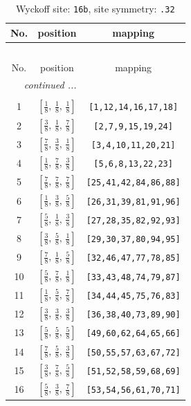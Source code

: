 \documentclass[fleqn,8pt]{jsarticle}
\begin{document}
\renewcommand{\arraystretch}{1.2}
\begin{longtable}{ccc}
\caption{Wyckoff site: {\tt 16b}, site symmetry: {\tt .32}}
 \\
 \hline \hline
No. & position & mapping \\ \hline \endfirsthead

\multicolumn{2}{l}{\tablename\ \thetable{}} \\
 \hline \hline
No. & position & mapping \\ \hline \endhead

 \hline \hline
\multicolumn{2}{r}{\footnotesize\it continued ...} \\ \endfoot

 \hline \hline
\multicolumn{2}{r}{} \\ \endlastfoot

1 & $\left[ \frac{1}{8},\, \frac{1}{8},\, \frac{1}{8} \right]$ & {\tt [1,12,14,16,17,18]} \\ \hline
2 & $\left[ \frac{3}{8},\, \frac{1}{8},\, \frac{7}{8} \right]$ & {\tt [2,7,9,15,19,24]} \\ \hline
3 & $\left[ \frac{7}{8},\, \frac{3}{8},\, \frac{1}{8} \right]$ & {\tt [3,4,10,11,20,21]} \\ \hline
4 & $\left[ \frac{1}{8},\, \frac{7}{8},\, \frac{3}{8} \right]$ & {\tt [5,6,8,13,22,23]} \\ \hline
5 & $\left[ \frac{7}{8},\, \frac{7}{8},\, \frac{7}{8} \right]$ & {\tt [25,41,42,84,86,88]} \\ \hline
6 & $\left[ \frac{1}{8},\, \frac{3}{8},\, \frac{5}{8} \right]$ & {\tt [26,31,39,81,91,96]} \\ \hline
7 & $\left[ \frac{5}{8},\, \frac{1}{8},\, \frac{3}{8} \right]$ & {\tt [27,28,35,82,92,93]} \\ \hline
8 & $\left[ \frac{3}{8},\, \frac{5}{8},\, \frac{1}{8} \right]$ & {\tt [29,30,37,80,94,95]} \\ \hline
9 & $\left[ \frac{7}{8},\, \frac{1}{8},\, \frac{5}{8} \right]$ & {\tt [32,46,47,77,78,85]} \\ \hline
10 & $\left[ \frac{5}{8},\, \frac{7}{8},\, \frac{1}{8} \right]$ & {\tt [33,43,48,74,79,87]} \\ \hline
11 & $\left[ \frac{1}{8},\, \frac{5}{8},\, \frac{7}{8} \right]$ & {\tt [34,44,45,75,76,83]} \\ \hline
12 & $\left[ \frac{3}{8},\, \frac{3}{8},\, \frac{3}{8} \right]$ & {\tt [36,38,40,73,89,90]} \\ \hline
13 & $\left[ \frac{5}{8},\, \frac{5}{8},\, \frac{5}{8} \right]$ & {\tt [49,60,62,64,65,66]} \\ \hline
14 & $\left[ \frac{7}{8},\, \frac{5}{8},\, \frac{3}{8} \right]$ & {\tt [50,55,57,63,67,72]} \\ \hline
15 & $\left[ \frac{3}{8},\, \frac{7}{8},\, \frac{5}{8} \right]$ & {\tt [51,52,58,59,68,69]} \\ \hline
16 & $\left[ \frac{5}{8},\, \frac{3}{8},\, \frac{7}{8} \right]$ & {\tt [53,54,56,61,70,71]} \\
\end{longtable}
\end{document}
